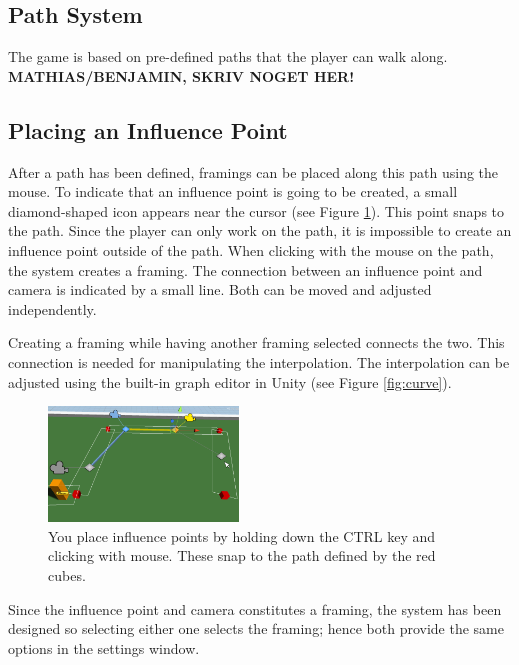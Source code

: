 \subsection{Path System}
The game is based on pre-defined paths that the player can walk along.
\textbf{MATHIAS/BENJAMIN, SKRIV NOGET HER!}

\subsection{Placing an Influence Point}
After a path has been defined, framings can be placed along this path using the mouse. To indicate that an influence point is going to be created, a small diamond-shaped icon appears near the cursor (see Figure \ref{fig:placingInfluencePoint}). This point snaps to the path. Since the player can only work on the path, it is impossible to create an influence point outside of the path. When clicking with the mouse on the path, the system creates a framing. The connection between an influence point and camera is indicated by a small line. Both can be moved and adjusted independently.

Creating a framing while having another framing selected connects the two. This connection is needed for manipulating the interpolation. The interpolation can be adjusted using the built-in graph editor in Unity (see Figure \ref{fig:curve}).

\begin{figure}[htbp]
\centering
\includegraphics[width=0.45\textwidth]{Pics/placingInfluencePoint}
\caption{You place influence points by holding down the CTRL key and clicking with mouse. These snap to the path defined by the red cubes.}
\label{fig:placingInfluencePoint}
\end{figure}


Since the influence point and camera constitutes a framing, the system has been designed so selecting either one selects the framing; hence both provide the same options in the settings window.

